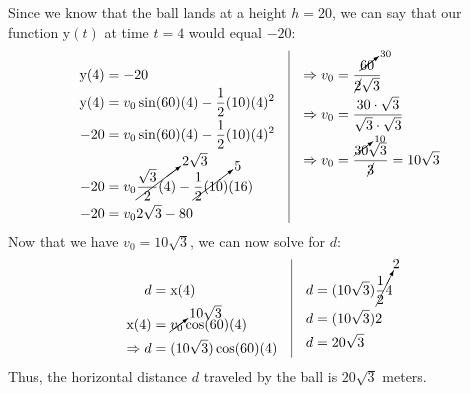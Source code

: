 \documentclass{article}
\newcommand{\x}{\mathrm{x}}
\newcommand{\y}{\mathrm{y}}
\begin{document}
Since we know that the ball lands at a height $h=20$, we can say that
our function $\y(t)$ at time $t=4$ would equal $-20$:
\[
\begin{array}{lcl}
\begin{aligned}[t]
    \y(4) &= -20 \\
    \y(4) &= v_0\sin(60)(4)-\frac{1}{2}(10)(4)^2 \\
      -20 &= v_0\sin(60)(4)-\frac{1}{2}(10)(4)^2 \\
      -20 &= v_0\cancelto{2\sqrt3}{\frac{\sqrt3}{2}(4)}-\cancelto{5}{\frac{1}{2}(10)}(16) \\
      -20 &= v_02\sqrt3-80 \\
\end{aligned}
\hspace{1em}\vline\hspace{1em}
\begin{aligned}[t]
    \Rightarrow v_0 &= \frac{\cancelto{30}{60}}{\cancel{2}\sqrt3} \\
    \Rightarrow v_0 &= \frac{30\cdot \sqrt3}{\sqrt3 \cdot \sqrt3} \\
    \Rightarrow v_0 &= \frac{\cancelto{10}{30}\sqrt3}{\cancel{3}} = 10\sqrt3
\end{aligned}
\end{array}
\]
Now that we have $v_0=10\sqrt3$, we can now solve for $d$:
\[
    \begin{aligned}[t]
            d &= \x(4) \\
        \x(4) &= \cancelto{10\sqrt3}{v_0}\cos(60)(4) \\
\Rightarrow d &= (10\sqrt3)\cos(60)(4) \\
    \end{aligned}
    \hspace{1em}\vline\hspace{1em}
    \begin{aligned}[t]
            d &= (10\sqrt3)\cancelto{2}{\frac{1}{2}{4}} \\
            d &= (10\sqrt3)2  \\
            d &= 20\sqrt3 
    \end{aligned}
\]
Thus, the horizontal distance $d$ traveled by the ball is 
$20\sqrt3$ meters.

\newpage
\end{document}
